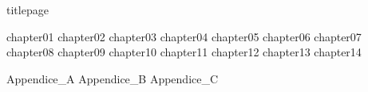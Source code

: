 
\usepackage{set-citations}



\frontmatter

	{titlepage}
	\tableofcontents

\mainmatter

	{chapter01}
	{chapter02}
	{chapter03}
	{chapter04}
	{chapter05}
	{chapter06}
	{chapter07}
	{chapter08}
	{chapter09}
	{chapter10}
	{chapter11}
	{chapter12}
	{chapter13}
	{chapter14}

	\appendix
	{Appendice_A}
	\restoregeometry
	{Appendice_B}
	{Appendice_C}
\backmatter


